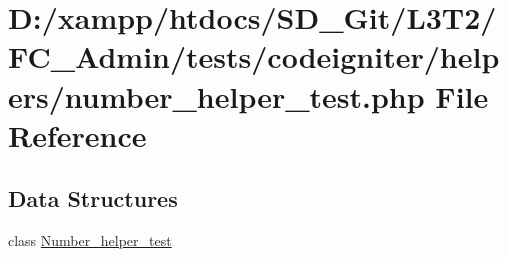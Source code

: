 \hypertarget{_admin_2tests_2codeigniter_2helpers_2number__helper__test_8php}{}\section{D\+:/xampp/htdocs/\+S\+D\+\_\+\+Git/\+L3\+T2/\+F\+C\+\_\+\+Admin/tests/codeigniter/helpers/number\+\_\+helper\+\_\+test.php File Reference}
\label{_admin_2tests_2codeigniter_2helpers_2number__helper__test_8php}
\subsection*{Data Structures}
\begin{DoxyCompactItemize}
\item 
class \hyperlink{class_number__helper__test}{Number\+\_\+helper\+\_\+test}
\end{DoxyCompactItemize}
